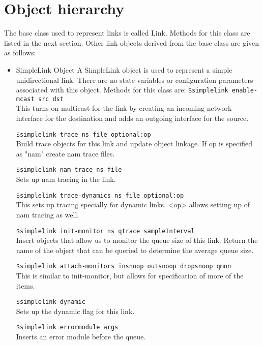 \section{Object hierarchy}
\label{sec:linkobjects}

The base class used to represent links is called Link. Methods for
this class are listed in the next section. Other link objects derived from
the base class are given as follows:

\begin{itemize}

\item SimpleLink Object
A SimpleLink object is used to represent a simple unidirectional link.
There are no state variables or configuration parameters associated with
this object. Methods for this class are:
{\tt \$simplelink enable-mcast \<src\> \<dst\>}\\
This turns on multicast for the link by creating an incoming network
interface for the destination and adds an outgoing interface for the
source.

{\tt \$simplelink trace \<ns\> \<file\> \<optional:op\>}\\
Build trace objects for this link and update object linkage. If op is
specified as "nam" create nam trace files.

{\tt \$simplelink nam-trace \<ns\> \<file\>}\\
Sets up nam tracing in the link.

{\tt \$simplelink trace-dynamics \<ns\> \<file\> \<optional:op\>}\\
This sets up tracing specially for dynamic links. <op> allows setting up
of nam tracing as well.

{\tt \$simplelink init-monitor \<ns\> \<qtrace\> \<sampleInterval\>}\\
Insert objects that allow us to monitor the queue size of this link.
Return the name of the object that can be queried to determine the average
queue size.

{\tt \$simplelink attach-monitors \<insnoop\> \<outsnoop\> \<dropsnoop\> \<qmon\>}\\
This is similar to init-monitor, but allows for specification of more of
the items.

{\tt \$simplelink dynamic}\\
Sets up the dynamic flag for this link.

{\tt \$simplelink errormodule \<args\>}\\
Inserts an error module before the queue.


\end{itemize}
